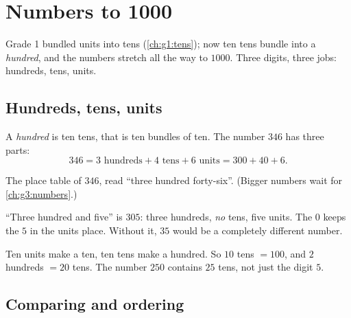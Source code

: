 \chapter{Numbers to 1000}\label{ch:g2:numbers}

Grade 1 bundled units into tens (\cref{ch:g1:tens}); now ten tens
bundle into a \emph{hundred}, and the numbers stretch all the way to
$1000$. Three digits, three jobs: hundreds, tens, units.

\section{Hundreds, tens, units}

\begin{definition}\label{def:g2:numbers:places}
A \emph{hundred} is ten tens, that is ten bundles of ten. The
number $346$ has three parts:
\[
346 = 3 \text{ hundreds} + 4 \text{ tens} + 6 \text{ units}
= 300 + 40 + 6 .
\]
\end{definition}

\begin{omfigure}

{\small The place table of $346$, read ``three hundred forty-six''.
(Bigger numbers wait for \cref{ch:g3:numbers}.)}
\end{omfigure}

\begin{example}\label{ex:g2:numbers:zero}
``Three hundred and five'' is $305$: three hundreds, \emph{no}
tens, five units. The $0$ keeps the $5$ in the units place. Without
it, $35$ would be a completely different number.
\end{example}

\begin{example}[Exchanging]\label{ex:g2:numbers:exchange}
Ten units make a ten, ten tens make a hundred. So $10$ tens
$= 100$, and $2$ hundreds $= 20$ tens. The number $250$ contains
$25$ tens, not just the digit $5$.
\end{example}

\section{Comparing and ordering}

